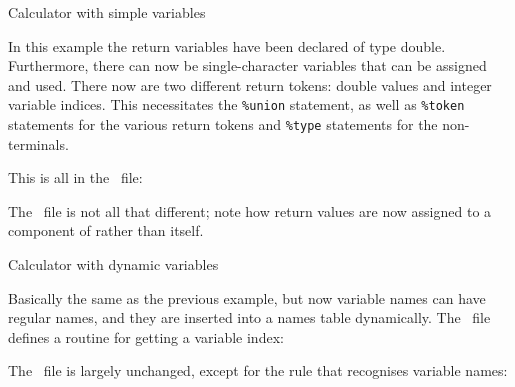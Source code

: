  {Calculator with simple variables}
\label{ex:calc2}

In this example the return variables have been declared of type
double. Furthermore, there can now be single-character variables that
can be assigned and used. There now are two different return tokens:
double values and integer variable indices.
This necessitates the \verb+%union+ statement, as well as
\verb+%token+ statements for the various return tokens and
\verb+%type+ statements for the non-terminals.

This is all in the \yacc\ file:

The \lex\ file is not all that different; note how return values are
now assigned to a component of  rather than 
itself.


 {Calculator with dynamic variables}
\label{ex:calc3}

Basically the same as the previous example, but now variable names can
have regular names, and they are inserted into a names table
dynamically. The \yacc\ file defines a routine for getting a variable
index:

The \lex\ file is largely unchanged, except for the rule that
recognises variable names:

